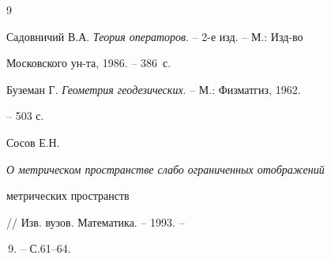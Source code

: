  


\begin{thebibliography}{9} 


 




Садовничий В.А. {\em Теория операторов}. -- 2-е изд. -- М.: Изд-во 


Московского ун-та, 1986. -- 386~с. 


 




Буземан Г. {\em Геометрия геодезических}. -- М.: Физматгиз, 1962. 


-- 503 с. 


 




Сосов Е.Н. {\em О метрическом пространстве слабо ограниченных отображений 


метрических пространств} // Изв. вузов. Математика. -- 1993. -- 


\No\,9. -- С.61--64. 


 


 


\end{thebibliography} 


 


\vskip 2cm 


 






 


 


